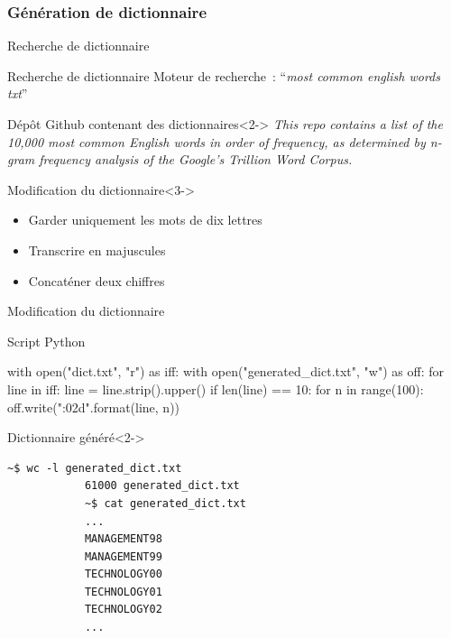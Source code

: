 \documentclass[10pt,sans,usenames,dvipsnames,french,compress]{beamer}
\begin{document}
\subsubsection{Génération de dictionnaire}
\begin{frame}{Recherche de dictionnaire}
	\begin{block}{Recherche de dictionnaire}
		Moteur de recherche : ``\textit{most common english words txt}''
	\end{block}

	\begin{exampleblock}{Dépôt Github contenant des dictionnaires}<2->
		\textit{This repo contains a list of the 10,000 most common English words in order of frequency, as determined by n-gram frequency analysis of the Google's Trillion Word Corpus.}
	\end{exampleblock}

	\begin{block}{Modification du dictionnaire}<3->
		\begin{itemize}
			\item Garder uniquement les mots de dix lettres
			\item Transcrire en majuscules
			\item Concaténer deux chiffres
		\end{itemize}
	\end{block}
\end{frame}

\begin{frame}[fragile]{Modification du dictionnaire}
	\vspace{-1mm}
	\begin{block}{Script Python}
		\begin{python}
			with open("dict.txt", "r") as iff:
				with open("generated_dict.txt", "w") as off:
					for line in iff:
						line = line.strip().upper()
						if len(line) == 10:
							for n in range(100):
								off.write("{}{:02d}\n".format(line, n))
		\end{python}
		\vspace{-2mm}
	\end{block}
	\vspace{-1mm}
	\begin{block}{Dictionnaire généré}<2->
		\vspace{-3mm}
		\begin{lstlisting}[style=Term]
			~$ wc -l generated_dict.txt
			61000 generated_dict.txt
			~$ cat generated_dict.txt
			...
			MANAGEMENT98
			MANAGEMENT99
			TECHNOLOGY00
			TECHNOLOGY01
			TECHNOLOGY02
			...
		\end{lstlisting}
		\vspace{-2mm}
	\end{block}
\end{frame}
\end{document}
